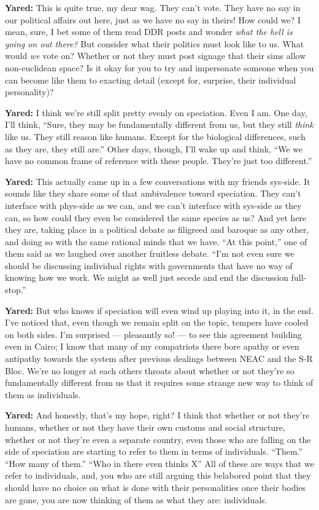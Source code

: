 \textbf{Yared:} This is quite true, my dear wag. They can't vote. They have no say in our political affairs out here, just as we have no say in theirs! How could we? I mean, sure, I bet some of them read DDR posts and wonder \emph{what the hell is going on out there?} But consider what their politics must look like to us. What would \emph{we} vote on? Whether or not they must post signage that their sims allow non-euclidean space? Is it okay for you to try and impersonate someone when you can become like them to exacting detail (except for, surprise, their individual personality)?

\textbf{Yared:} I think we're still split pretty evenly on speciation. Even I am. One day, I'll think, ``Sure, they may be fundamentally different from us, but they still \emph{think} like us. They still reason like humans. Except for the biological differences, such as they are, they still are.'' Other days, though, I'll wake up and think, ``We we have no common frame of reference with these people. They're just too different.''

\textbf{Yared:} This actually came up in a few conversations with my friends sys-side. It sounds like they share some of that ambivalence toward speciation. They can't interface with phys-side as we can, and we can't interface with sys-side as they can, so how could they even be considered the same species as us? And yet here they are, taking place in a political debate as filigreed and baroque as any other, and doing so with the same rational minds that we have. ``At this point,'' one of them said as we laughed over another fruitless debate. ``I'm not even sure we should be discussing individual rights with governments that have no way of knowing how we work. We might as well just secede and end the discussion full-stop.''

\textbf{Yared:} But who knows if speciation will even wind up playing into it, in the end. I've noticed that, even though we remain split on the topic, tempers have cooled on both sides. I'm surprised — pleasantly so! — to see this agreement building even in Cairo; I know that many of my compatriots there bore apathy or even antipathy towards the system after previous dealings between NEAC and the S-R Bloc. We're no longer at each others throats about whether or not they're so fundamentally different from us that it requires some strange new way to think of them as individuals.

\textbf{Yared:} And honestly, that's my hope, right? I think that whether or not they're humans, whether or not they have their own customs and social structure, whether or not they're even a separate country, even those who are falling on the side of speciation are starting to refer to them in terms of individuals. ``Them.'' ``How many of them.'' ``Who in there even thinks X'' All of these are ways that we refer to individuals, and, you who are still arguing this belabored point that they should have no choice on what is done with their personalities once their bodies are gone, you are now thinking of them as what they are: individuals.

